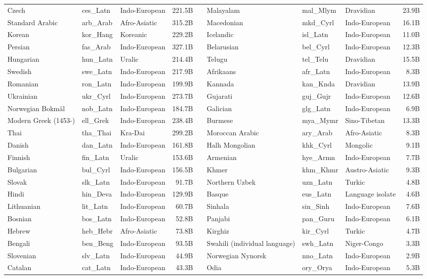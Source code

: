 \documentclass[11pt]{article}
\begin{document}
\begin{table}[htbp]
{\begin{tabular}{lllrllllr}
Czech &ces\_Latn &Indo-European &221.5B & &Malayalam &mal\_Mlym &Dravidian &23.9B \\
Standard Arabic &arb\_Arab &Afro-Asiatic &315.2B & &Macedonian &mkd\_Cyrl &Indo-European &16.1B \\
Korean &kor\_Hang &Koreanic &229.2B & &Icelandic &isl\_Latn &Indo-European &11.0B \\
Persian &fas\_Arab &Indo-European &327.1B & &Belarusian &bel\_Cyrl &Indo-European &12.3B \\
Hungarian &hun\_Latn &Uralic &214.4B & &Telugu &tel\_Telu &Dravidian &15.5B \\
Swedish &swe\_Latn &Indo-European &217.9B & &Afrikaans &afr\_Latn &Indo-European &8.3B \\
Romanian &ron\_Latn &Indo-European &199.9B & &Kannada &kan\_Knda &Dravidian &13.9B \\
Ukrainian &ukr\_Cyrl &Indo-European &273.7B & &Gujarati &guj\_Gujr &Indo-European &12.6B \\
Norwegian Bokmål &nob\_Latn &Indo-European &184.7B & &Galician &glg\_Latn &Indo-European &6.9B \\
Modern Greek (1453-) &ell\_Grek &Indo-European &238.4B & &Burmese &mya\_Mymr &Sino-Tibetan &13.3B \\
Thai &tha\_Thai &Kra-Dai &299.2B & &Moroccan Arabic &ary\_Arab &Afro-Asiatic &8.3B \\
Danish &dan\_Latn &Indo-European &161.8B & &Halh Mongolian &khk\_Cyrl &Mongolic &9.1B \\
Finnish &fin\_Latn &Uralic &153.6B & &Armenian &hye\_Armn &Indo-European &7.7B \\
Bulgarian &bul\_Cyrl &Indo-European &156.5B & &Khmer &khm\_Khmr &Austro-Asiatic &9.3B \\
Slovak &slk\_Latn &Indo-European &91.7B & &Northern Uzbek &uzn\_Latn &Turkic &4.8B \\
Hindi &hin\_Deva &Indo-European &129.9B & &Basque &eus\_Latn &Language isolate &4.6B \\
Lithuanian &lit\_Latn &Indo-European &60.7B & &Sinhala &sin\_Sinh &Indo-European &7.6B \\
Bosnian &bos\_Latn &Indo-European &52.8B & &Panjabi &pan\_Guru &Indo-European &6.1B \\
Hebrew &heb\_Hebr &Afro-Asiatic &73.8B & &Kirghiz &kir\_Cyrl &Turkic &4.7B \\
Bengali &ben\_Beng &Indo-European &93.5B & &Swahili (individual language) &swh\_Latn &Niger-Congo &3.3B \\
Slovenian &slv\_Latn &Indo-European &44.9B & &Norwegian Nynorsk &nno\_Latn &Indo-European &2.9B \\
Catalan &cat\_Latn &Indo-European &43.3B & &Odia &ory\_Orya &Indo-European &5.3B \\
\bottomrule
\end{tabular}
}
\end{table}
\end{document}
